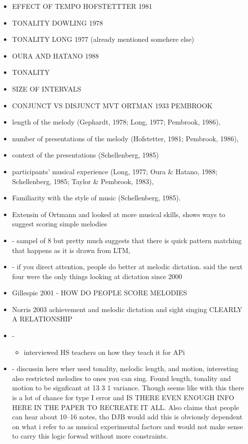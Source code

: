 \documentclass[]{book}
\providecommand{\tightlist}{%
  \setlength{\itemsep}{0pt}\setlength{\parskip}{0pt}}
\theoremstyle{definition}
\theoremstyle{definition}
\theoremstyle{definition}
\theoremstyle{remark}
\begin{document}
\begin{itemize}
\item
  EFFECT OF TEMPO HOFSTETTTER 1981
\item
  TONALITY DOWLING 1978
\item
  TONALITY LONG 1977 (already mentioned somehere else)
\item
  OURA AND HATANO 1988
\item
  TONALITY \citep{pembrookInterferenceTranscriptionProcess1986}
\item
  SIZE OF INTERVALS \citep{ortmannTonalDeterminantsMelodic1933}
\item
  CONJUNCT VS DISJUNCT MVT ORTMAN 1933 PEMBROOK
\item
  length of the melody (Gephardt, 1978; Long, 1977; Pembrook, 1986),
\item
  number of presentations of the melody (Hofstetter, 1981; Pembrook,
  1986),
\item
  context of the presentations (Schellenberg, 1985)
\item
  participants' musical experience (Long, 1977; Oura \& Hatano, 1988;
  Schellenberg, 1985; Taylor \& Pembrook, 1983),
\item
  Familiarity with the style of music (Schellenberg, 1985).
\item
  \citep{taylorStrategiesMemoryShort1983} Extensin of Ortmann and looked
  at more musical skills, shows ways to suggest scoring simple melodies
\item
  \citep{ouraConstructingRepresentationMelody1991a} - sampel of 8 but
  pretty much suggests that there is quick pattern matching that happens
  as it is drawn from LTM,
\item
  \citep{paneyEffectDirectingAttention2016} - if you direct attention,
  people do better at melodic dictation. said the next four were the
  only things looking at dictation since 2000
\item
  Gillespie 2001 - HOW DO PEOPLE SCORE MELODIES
\item
  Norris 2003 achievement and melodic dictation and sight singing
  CLEARLY A RELATIONSHIP
\item
  \citep{pembrookSendHelpAural1990} -

  \begin{itemize}
  \tightlist
  \item
    \citep{paneyTeachingMelodicDictation2014} interviewed HS teachers on
    how they teach it for APi
  \end{itemize}
\item
  \citep{pembrookInterferenceTranscriptionProcess1986} - discussin here
  wher used tonality, melodic length, and motion, interesting also
  restricted melodies to ones you can sing. Found length, tonality and
  motion to be signficant at 13 3 1 variance. Though seems like with
  this there is a lot of chance for type I error and IS THERE EVEN
  ENOUGH INFO HERE IN THE PAPER TO RECREATE IT ALL. Also claims that
  people can hear about 10--16 notes, tho DJB would add this is
  obviously dependent on what i refer to as musical experimental factors
  and would not make sense to carry this logic forwad without more
  constraints.
\end{itemize}
\end{document}
